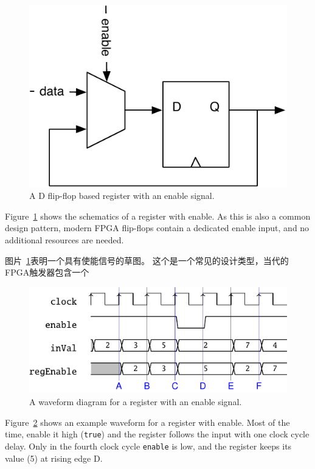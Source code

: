 \documentclass[%
    10pt,
    headinclude, footexclude,
    openright, %
    notitlepage,
    cleardoubleempty,
    headsepline,
    pointlessnumbers,
    bibtotoc, idxtotoc,
    ]{scrbook}
\newcommand{\code}[1]{{\small{\texttt{#1}}}}
\newcommand{\scale}{0.7}
\begin{document}
\begin{figure}
  \centering
  \includegraphics[scale=\scale]{figures/register-enable}
  \caption{A D flip-flop based register with an enable signal.}
  \label{fig:register-enable}
\end{figure}

Figure~\ref{fig:register-enable} shows the schematics of a register with enable.
As this is also a common design pattern, modern FPGA flip-flops contain a
dedicated enable input, and no additional resources are needed.

图片~\ref{fig:register-enable}表明一个具有使能信号的草图。
这个是一个常见的设计类型，当代的FPGA触发器包含一个

\begin{figure}
  \centering
  \includegraphics[scale=1]{figures/reg_en_wave}
  \caption{A waveform diagram for a register with an enable signal.}
  \label{fig:register-en-wave}
\end{figure}

Figure~\ref{fig:register-en-wave} shows an example waveform for a register
with enable. Most of the time, enable it high (\code{true}) and the register
follows the input with one clock cycle delay. Only in the fourth clock cycle
\code{enable} is low, and the register keeps its value (5) at rising edge D.
\end{document}
